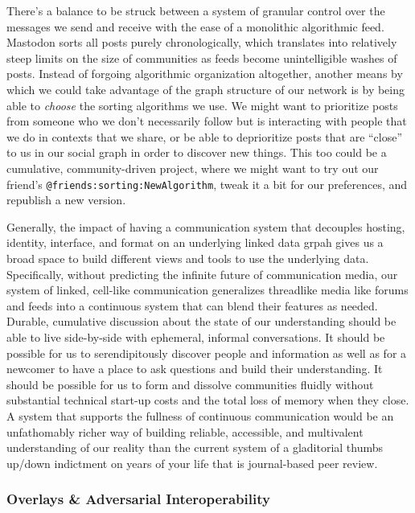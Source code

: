 There's a balance to be struck between a system of granular control over
the messages we send and receive with the ease of a monolithic
algorithmic feed. Mastodon sorts all posts purely chronologically, which
translates into relatively steep limits on the size of communities as
feeds become unintelligible washes of posts. Instead of forgoing
algorithmic organization altogether, another means by which we could
take advantage of the graph structure of our network is by being able to
\emph{choose} the sorting algorithms we use. We might want to prioritize
posts from someone who we don't necessarily follow but is interacting
with people that we do in contexts that we share, or be able to
deprioritize posts that are ``close'' to us in our social graph in order
to discover new things. This too could be a cumulative, community-driven
project, where we might want to try out our friend's
\texttt{@friends:sorting:NewAlgorithm}, tweak it a bit for our
preferences, and republish a new version.

Generally, the impact of having a communication system that decouples
hosting, identity, interface, and format on an underlying linked data
grpah gives us a broad space to build different views and tools to use
the underlying data. Specifically, without predicting the infinite
future of communication media, our system of linked, cell-like
communication generalizes threadlike media like forums and feeds into a
continuous system that can blend their features as needed. Durable,
cumulative discussion about the state of our understanding should be
able to live side-by-side with ephemeral, informal conversations. It
should be possible for us to serendipitously discover people and
information as well as for a newcomer to have a place to ask questions
and build their understanding. It should be possible for us to form and
dissolve communities fluidly without substantial technical start-up
costs and the total loss of memory when they close. A system that
supports the fullness of continuous communication would be an
unfathomably richer way of building reliable, accessible, and
multivalent understanding of our reality than the current system of a
gladitorial thumbs up/down indictment on years of your life that is
journal-based peer review.

\hypertarget{overlays-adversarial-interoperability}{%
\subsubsection{Overlays \& Adversarial
Interoperability}\label{overlays-adversarial-interoperability}}

